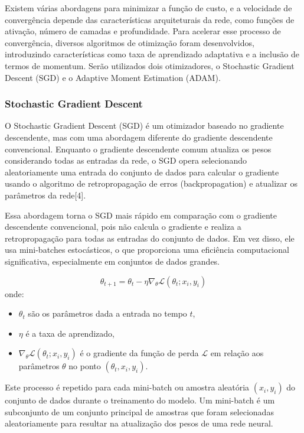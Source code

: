 \documentclass[conference]{IEEEtran}
\begin{document}
Existem várias abordagens para minimizar a função de custo, e a velocidade de convergência depende das características arquiteturais da rede, como funções de ativação, número de camadas e profundidade. Para acelerar esse processo de convergência, diversos algoritmos de otimização foram desenvolvidos, introduzindo características como taxa de aprendizado adaptativa e a inclusão de termos de momentum. Serão utilizados dois otimizadores, o Stochastic Gradient Descent (SGD) e o Adaptive Moment Estimation (ADAM).

\vspace{10pt}

\subsubsection{Stochastic Gradient Descent}

O Stochastic Gradient Descent (SGD) é um otimizador baseado no gradiente descendente, mas com uma abordagem diferente do gradiente descendente convencional. Enquanto o gradiente descendente comum atualiza os pesos considerando todas as entradas da rede, o SGD opera selecionando aleatoriamente uma entrada do conjunto de dados para calcular o gradiente usando o algoritmo de retropropagação de erros (backpropagation) e atualizar os parâmetros da rede[4].

Essa abordagem torna o SGD mais rápido em comparação com o gradiente descendente convencional, pois não calcula o gradiente e realiza a retropropagação para todas as entradas do conjunto de dados. Em vez disso, ele usa mini-batches estocásticos, o que proporciona uma eficiência computacional significativa, especialmente em conjuntos de dados grandes.

\[
\theta_{t+1} = \theta_t - \eta \nabla_{\theta} \mathcal{L}(\theta_t; x_i, y_i)
\]
onde:
\begin{itemize}
    \item \( \theta_t \) são os parâmetros dada a entrada no tempo \( t \),
    \item \( \eta \) é a taxa de aprendizado,
    \item \( \nabla_{\theta} \mathcal{L}(\theta_t; x_i, y_i) \) é o gradiente da função de perda \( \mathcal{L} \) em relação aos parâmetros \( \theta \) no ponto \( (\theta_t, x_i, y_i) \).
\end{itemize}

\vspace{10pt}
Este processo é repetido para cada mini-batch ou amostra aleatória \( (x_i, y_i) \) do conjunto de dados durante o treinamento do modelo. Um mini-batch é um subconjunto de um conjunto principal de amostras que foram selecionadas aleatoriamente para resultar na atualização dos pesos de uma rede neural.
\vspace{10pt}
\end{document}
